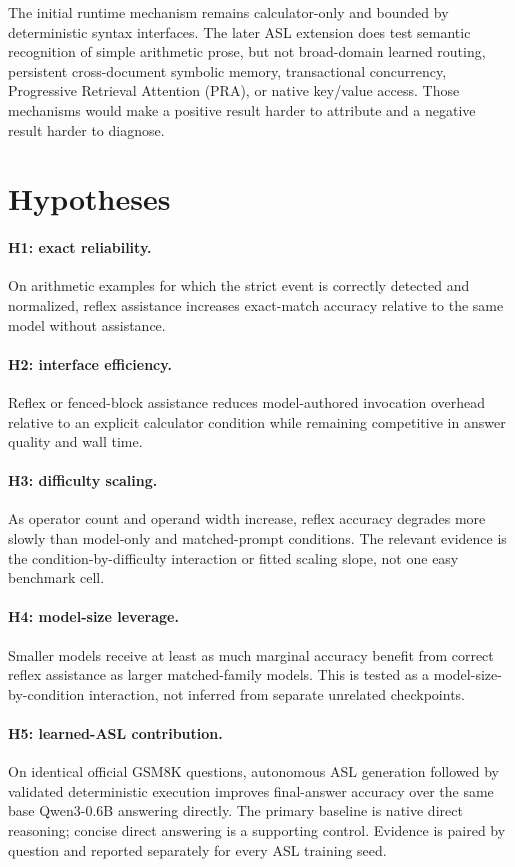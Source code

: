 \documentclass[11pt]{article}
\begin{document}
The initial runtime mechanism remains calculator-only and bounded by
deterministic syntax interfaces. The later ASL extension does test semantic
recognition of simple arithmetic prose, but not broad-domain learned routing,
persistent cross-document symbolic memory, transactional concurrency,
Progressive Retrieval Attention (PRA), or native key/value access. Those
mechanisms would make a positive result harder to attribute and a negative
result harder to diagnose.

\section{Hypotheses}

\paragraph{H1: exact reliability.}
On arithmetic examples for which the strict event is correctly detected and
normalized, reflex assistance increases exact-match accuracy relative to the
same model without assistance.

\paragraph{H2: interface efficiency.}
Reflex or fenced-block assistance reduces model-authored invocation overhead
relative to an explicit calculator condition while remaining competitive in
answer quality and wall time.

\paragraph{H3: difficulty scaling.}
As operator count and operand width increase, reflex accuracy degrades more
slowly than model-only and matched-prompt conditions. The relevant evidence is
the condition-by-difficulty interaction or fitted scaling slope, not one easy
benchmark cell.

\paragraph{H4: model-size leverage.}
Smaller models receive at least as much marginal accuracy benefit from correct
reflex assistance as larger matched-family models. This is tested as a
model-size-by-condition interaction, not inferred from separate unrelated
checkpoints.

\paragraph{H5: learned-ASL contribution.}
On identical official GSM8K questions, autonomous ASL generation followed by
validated deterministic execution improves final-answer accuracy over the same
base Qwen3-0.6B answering directly. The primary baseline is native direct
reasoning; concise direct answering is a supporting control. Evidence is paired
by question and reported separately for every ASL training seed.
\end{document}
